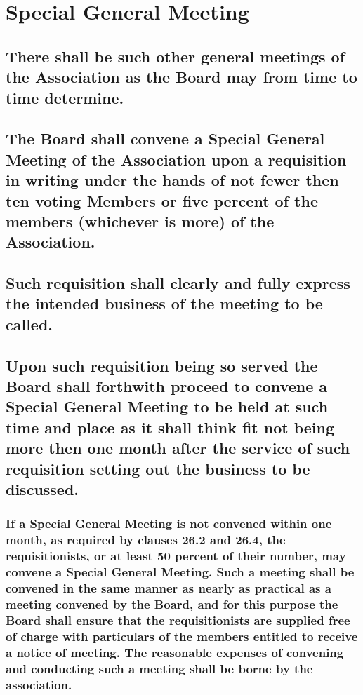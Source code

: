 \documentclass{article}
\newenvironment{subs}
  {\adjustwidth{2em}{0pt}}
  {\endadjustwidth}
\begin{document}
\section{Special General Meeting}
\begin{subs}
\subsection{There shall be such other general meetings of the Association as the Board may from time to time determine.}
\subsection{The Board shall convene a Special General Meeting of the Association upon a requisition in writing under the hands of not fewer then ten voting Members or five percent of the members (whichever is more) of the Association.}
\subsection{Such requisition shall clearly and fully express the intended business of the meeting to be called.}
\subsection{Upon such requisition being so served the Board shall forthwith proceed to convene a Special General Meeting to be held at such time and place as it shall think fit not being more then one month after the service of such requisition setting out the business to be discussed.}
\subsubsection{If a Special General Meeting is not convened within one month, as required by clauses 26.2 and 26.4, the requisitionists, or at least 50 percent of their number, may convene a Special General Meeting. Such a meeting shall be convened in the same manner as nearly as practical as a meeting convened by the Board, and for this purpose the Board shall ensure that the requisitionists are supplied free of charge with particulars of the members entitled to receive a notice of meeting. The reasonable expenses of convening and conducting such a meeting shall be borne by the association.}
\end{subs}
\end{document}
